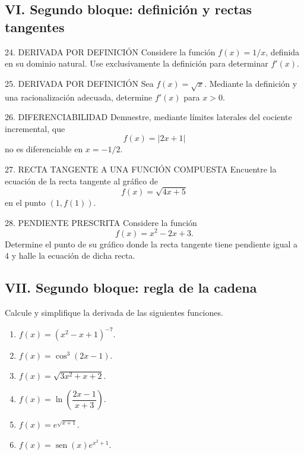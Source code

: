\documentclass[letterpaper,12pt]{article}
\newcommand{\sen}{\operatorname{sen}}
\newcommand{\tituloSeccion}[1]{%
    \needspace{4\baselineskip}
    \subsection*{\color{azulFuerte}#1}
}
\begin{document}
\tituloSeccion{VI. Segundo bloque: definición y rectas tangentes}

\begin{controlbox}{24. DERIVADA POR DEFINICIÓN}
Considere la función \(f(x)=1/x\), definida en su dominio natural. Use exclusivamente la definición para determinar \(f'(x)\).
\end{controlbox}

\begin{controlbox}{25. DERIVADA POR DEFINICIÓN}
Sea \(f(x)=\sqrt{x}\). Mediante la definición y una racionalización adecuada, determine \(f'(x)\) para \(x>0\).
\end{controlbox}

\begin{controlbox}{26. DIFERENCIABILIDAD}
Demuestre, mediante límites laterales del cociente incremental, que
\[
f(x)=|2x+1|
\]
no es diferenciable en \(x=-1/2\).
\end{controlbox}

\begin{controlbox}{27. RECTA TANGENTE A UNA FUNCIÓN COMPUESTA}
Encuentre la ecuación de la recta tangente al gráfico de
\[
f(x)=\sqrt{4x+5}
\]
en el punto \((1,f(1))\).
\end{controlbox}

\begin{controlbox}{28. PENDIENTE PRESCRITA}
Considere la función
\[
f(x)=x^2-2x+3.
\]
Determine el punto de su gráfico donde la recta tangente tiene pendiente igual a \(4\) y halle la ecuación de dicha recta.
\end{controlbox}

\tituloSeccion{VII. Segundo bloque: regla de la cadena}
\noindent Calcule y simplifique la derivada de las siguientes funciones.

\begin{enumerate}[label=\color{azulFuerte}\textbf{\arabic*.},leftmargin=*,start=29,itemsep=1em]
    \item \(f(x)=(x^2-x+1)^{-7}.\)

    \item \(f(x)=\cos^3(2x-1).\)

    \item \(f(x)=\sqrt{3x^2+x+2}.\)

    \item \(f(x)=\ln\!\left(\dfrac{2x-1}{x+3}\right).\)

    \item \(f(x)=e^{\sqrt{x+1}}.\)

    \item \(f(x)=\sen(x)e^{x^2+1}.\)
\end{enumerate}
\end{document}
